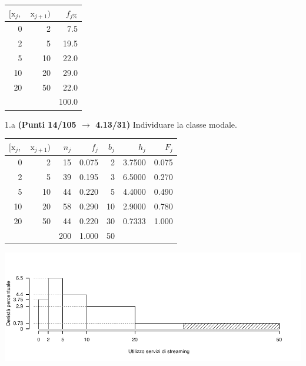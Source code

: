 \documentclass[
  11pt,
]{book}
\theoremstyle{mytheoremstyle}
\theoremstyle{mydefstyle}
\newenvironment{sol}
  {
  \begin{tcolorbox}[enhanced,breakable,arc=0.1mm,boxrule=1pt,colback=white,colframe=iblue,
  title=\bf \fontfamily{lmss}\selectfont \hspace{.5 cm} Soluzione,drop fuzzy shadow]

}{
\end{tcolorbox}
  }
\begin{document}
\begin{table}[H]
\centering
\begin{tabular}{rrr}
\toprule
$[\text{x}_j,$ & $\text{x}_{j+1})$ & $f_{j\%}$\\
\midrule
0 & 2 & 7.5\\
2 & 5 & 19.5\\
5 & 10 & 22.0\\
10 & 20 & 29.0\\
20 & 50 & 22.0\\
 &  & 100.0\\
\bottomrule
\end{tabular}
\end{table}

1.a \textbf{(Punti 14/105 \(\rightarrow\) 4.13/31)} Individuare la classe modale.

\begin{sol}

\begin{table}[H]
\centering
\begin{tabular}{rrrrrrr}
\toprule
$[\text{x}_j,$ & $\text{x}_{j+1})$ & $n_j$ & $f_j$ & $b_j$ & $h_j$ & $F_j$\\
\midrule
0 & 2 & 15 & 0.075 & 2 & 3.7500 & 0.075\\
2 & 5 & 39 & 0.195 & 3 & 6.5000 & 0.270\\
5 & 10 & 44 & 0.220 & 5 & 4.4000 & 0.490\\
10 & 20 & 58 & 0.290 & 10 & 2.9000 & 0.780\\
20 & 50 & 44 & 0.220 & 30 & 0.7333 & 1.000\\
 &  & 200 & 1.000 & 50 &  & \\
\bottomrule
\end{tabular}
\end{table}

\begin{center}\includegraphics{Esami_passati_con_soluzioni_files/figure-latex/2023-212-1} \end{center}

\end{sol}
\end{document}
